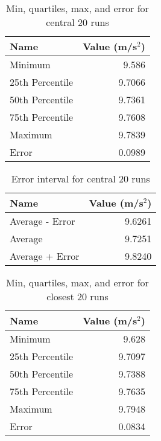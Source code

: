 \begin{table}[ht]
    \centering
    \begin{tabular}{|l|r|}
        \hline
        Name & Value (m/s$^{2}$) \\
        \hline
        Minimum & 9.586 \\
        25th Percentile & 9.7066 \\
        50th Percentile & 9.7361 \\
        75th Percentile & 9.7608 \\
        Maximum & 9.7839 \\
        Error & 0.0989 \\
        \hline
    \end{tabular}
    \caption{Min, quartiles, max, and error for central 20 runs}
    \label{table:01.describe.20.center}
\end{table}
%
\begin{table}[ht]
    \centering
    \begin{tabular}{|l|r|}
        \hline
        Name & Value (m/s$^{2}$) \\
        \hline
        Average - Error & 9.6261 \\
        Average & 9.7251 \\
        Average + Error & 9.8240 \\
        \hline
    \end{tabular}
    \caption{Error interval for central 20 runs}
    \label{table:01.error.20.center}
\end{table}
%
\begin{table}[ht]
    \centering
    \begin{tabular}{|l|r|}
        \hline
        Name & Value (m/s$^{2}$) \\
        \hline
        Minimum & 9.628 \\
        25th Percentile & 9.7097 \\
        50th Percentile & 9.7388 \\
        75th Percentile & 9.7635 \\
        Maximum & 9.7948 \\
        Error & 0.0834 \\
        \hline
    \end{tabular}
    \caption{Min, quartiles, max, and error for closest 20 runs}
    \label{table:01.describe.20.close}
\end{table}
